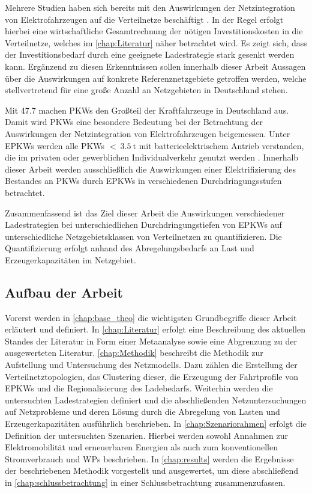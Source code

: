 Mehrere Studien haben sich bereits mit den Auswirkungen der Netzintegration von Elektrofahrzeugen auf die Verteilnetze beschäftigt \cite{Agora2019} \cite{DEAGH2018} \cite{BCG2018}.
In der Regel erfolgt hierbei eine wirtschaftliche Gesamtrechnung der nötigen Investitionskosten in die Verteilnetze, welches im \autoref{chap:Literatur} näher betrachtet wird.
Es zeigt sich, dass der Investitionsbedarf durch eine geeignete Ladestrategie stark gesenkt werden kann.
Ergänzend zu diesen Erkenntnissen sollen innerhalb dieser Arbeit Aussagen über die Auswirkungen auf konkrete Referenznetzgebiete getroffen werden, welche stellvertretend für eine große Anzahl an Netzgebieten in Deutschland stehen.\medskip

Mit \SI{47.7}{\MioFZs} \cite{KBA2020a} machen \glspl{PKW} den Großteil der Kraftfahrzeuge in Deutschland aus.
Damit wird \glspl{PKW} eine besondere Bedeutung bei der Betrachtung der Auswirkungen der Netzintegration von Elektrofahrzeugen beigemessen.
Unter \glspl{EPKW} werden alle \glspl{PKW} \(<~\SI{3.5}{\tonne}\) mit batterieelektrischem Antrieb verstanden, die im privaten oder gewerblichen Individualverkehr genutzt werden \cite{BNetzA2020}.
Innerhalb dieser Arbeit werden ausschließlich die Auswirkungen einer Elektrifizierung des Bestandes an \glspl{PKW} durch \glspl{EPKW} in verschiedenen Durchdringungsstufen betrachtet.\medskip

Zusammenfassend ist das Ziel dieser Arbeit die Auswirkungen verschiedener Lade\-strategien bei unterschiedlichen Durchdringungstiefen von \glspl{EPKW} auf unterschiedliche Netzgebietsklassen von Verteilnetzen zu quantifizieren.
Die Quantifizierung erfolgt anhand des Abregelungsbedarfs an Last und Erzeugerkapazitäten im Netzgebiet.


\subsection{Aufbau der Arbeit}

Vorerst werden in \autoref{chap:base_theo} die wichtigsten Grundbegriffe dieser Arbeit erläutert und definiert.
In \autoref{chap:Literatur} erfolgt eine Beschreibung des aktuellen Standes der Literatur in Form einer Metaanalyse sowie eine Abgrenzung zu der ausgewerteten Literatur.
\autoref{chap:Methodik} beschreibt die Methodik zur Aufstellung und Untersuchung des Netzmodells.
Dazu zählen die Erstellung der Verteilnetztopologien, das Clustering dieser, die Erzeugung der Fahrtprofile von \glspl{EPKW} und die Regionalisierung des Ladebedarfs.
Weiterhin werden die untersuchten Ladestrategien definiert und die abschließenden Netzuntersuchungen auf Netzprobleme und deren Lösung durch die Abregelung von Lasten und Erzeugerkapazitäten ausführlich beschrieben.
In \autoref{chap:Szenariorahmen} erfolgt die Definition der untersuchten Szenarien.
Hierbei werden sowohl Annahmen zur Elektromobilität und erneuerbaren Energien als auch zum konventionellen Stromverbrauch und \glspl{WP} beschrieben.
In \autoref{chap:results} werden die Ergebnisse der beschriebenen Methodik vorgestellt und ausgewertet, um diese abschließend in \autoref{chap:schlussbetrachtung} in einer Schlussbetrachtung zusammenzufassen.

\clearpage
